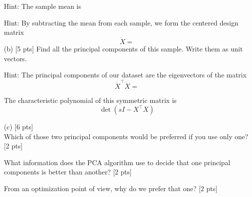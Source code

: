 \documentclass[10pt]{article}
\begin{document}
\begin{enumerate}[1.]
Hint: The sample mean is


Hint: By subtracting the mean from each sample, we form the centered design matrix
$$
\dot{X}=
$$
(b) [5 pts] Find all the principal components of this sample. Write them as unit vectors.

Hint: The principal components of our dataset are the eigenvectors of the matrix
$$
\dot{X}^{\top} \dot{X}=
$$

The characteristic polynomial of this symmetric matrix is
$$
\operatorname{det}\left(s I-X^{\top} X\right)
$$

(c) [6 pts]\\
Which of those two principal components would be preferred if you use only one? [2 pts]\par
What information does the PCA algorithm use to decide that one principal components is better than another? [2 pts]\par
From an optimization point of view, why do we prefer that one? [2 pts]\par


\end{enumerate}
\end{document}
